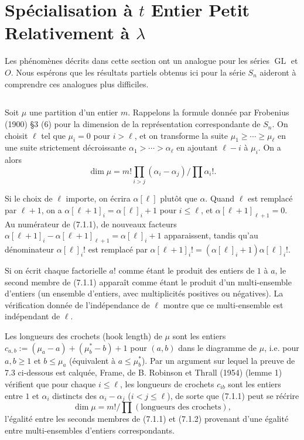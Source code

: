 \documentclass[11pt,a4paper]{article}
\theoremstyle{plain}
\theoremstyle{definition}
\DeclareMathOperator{\GL}{GL}
\begin{document}
\section{Sp\'ecialisation \`a $t$ Entier Petit Relativement \`a $\lambda$}

Les ph\'enom\`enes d\'ecrits dans cette section ont un analogue pour les s\'eries $\GL$ et $O$. Nous esp\'erons que les r\'esultats partiels obtenus ici pour la s\'erie $S_n$ aideront \`a comprendre ces analogues plus difficiles.

\subsection{}
Soit $\mu$ une partition d'un entier $m$. Rappelons la formule donn\'ee par Frobenius (1900) \S 3 (6) pour la dimension de la repr\'esentation correspondante de $S_n$. On choisit $\ell$ tel que $\mu_i = 0$ pour $i > \ell$, et on transforme la suite $\mu_1 \geq \cdots \geq \mu_\ell$ en une suite strictement d\'ecroissante $\alpha_1 > \cdots > \alpha_\ell$ en ajoutant $\ell - i$ \`a $\mu_i$. On a alors
\begin{equation}
\dim \mu = m! \prod_{i > j} (\alpha_i - \alpha_j) \big/ \prod \alpha_i!. \tag{7.1.1}
\end{equation}

Si le choix de $\ell$ importe, on \'ecrira $\alpha[\ell]$ plut\^ot que $\alpha$. Quand $\ell$ est remplac\'e par $\ell + 1$, on a $\alpha[\ell+1]_i = \alpha[\ell]_i + 1$ pour $i \leq \ell$, et $\alpha[\ell+1]_{\ell+1} = 0$. Au num\'erateur de (7.1.1), de nouveaux facteurs $\alpha[\ell+1]_i - \alpha[\ell+1]_{\ell+1} = \alpha[\ell]_i + 1$ apparaissent, tandis qu'au d\'enominateur $\alpha[\ell]_i!$ est remplac\'e par $\alpha[\ell+1]_i! = (\alpha[\ell]_i + 1)\alpha[\ell]_i!$.

Si on \'ecrit chaque factorielle $a!$ comme \'etant le produit des entiers de $1$ \`a $a$, le second membre de (7.1.1) appara\^it comme \'etant le produit d'un multi-ensemble d'entiers (un ensemble d'entiers, avec multiplicit\'es positives ou n\'egatives). La v\'erification donn\'ee de l'ind\'ependance de $\ell$ montre que ce multi-ensemble est ind\'ependant de $\ell$.

Les longueurs des crochets (hook length) de $\mu$ sont les entiers $c_{a,b} := (\mu_a - a) + (\mu^*_b - b) + 1$ pour $(a, b)$ dans le diagramme de $\mu$, i.e. pour $a, b \geq 1$ et $b \leq \mu_a$ (\'equivalent \`a $a \leq \mu^*_b$). Par un argument sur lequel la preuve de 7.3 ci-dessous est calqu\'ee, Frame, de B. Robinson et Thrall (1954) (lemme 1) v\'erifient que pour chaque $i \leq \ell$, les longueurs de crochets $c_{ib}$ sont les entiers entre $1$ et $\alpha_i$ distincts des $\alpha_i - \alpha_j$ ($i < j \leq \ell$), de sorte que (7.1.1) peut se r\'e\'crire
\begin{equation}
\dim \mu = m! / \prod (\text{longueurs des crochets}), \tag{7.1.2}
\end{equation}
l'\'egalit\'e entre les seconds membres de (7.1.1) et (7.1.2) provenant d'une \'egalit\'e entre multi-ensembles d'entiers correspondants.
\end{document}
